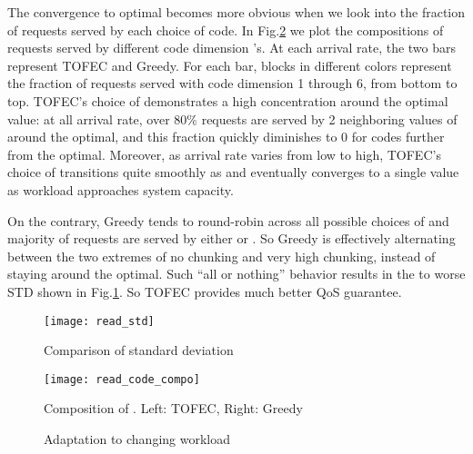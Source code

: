\documentclass[journal]{IEEEtran}
\newcommand{\ourproposal}{TOFEC\xspace}
\newcommand{\onewidth}{0.74\columnwidth}
\newcommand{\threewidth}{0.3\textwidth}
\begin{document}
The convergence to optimal becomes more obvious when we look into the fraction of requests served by each choice of code. In Fig.\ref{fig:read:composition} we plot the compositions of requests served by different code dimension 's. 
At each arrival rate, the two bars represent \ourproposal and Greedy. For each bar, blocks in different colors represent the fraction of requests served with code dimension
1 through 6, from bottom to top. \ourproposal's choice of  demonstrates a high concentration around the optimal value: at all arrival rate, over 80\%  requests are served by 2 neighboring values of  around the optimal, and this fraction quickly diminishes to 0 for codes further from the optimal. Moreover, as arrival rate varies from low to high, \ourproposal's choice of  transitions quite smoothly as  and eventually converges to a single value  as workload approaches system capacity.

On the contrary, Greedy tends to round-robin across all possible choices of  and majority of requests are served by either  or . So Greedy is effectively alternating between the two extremes of no chunking and very high chunking,  instead of staying around the optimal. 
Such ``all or nothing'' behavior results in the  to  worse STD shown in Fig.\ref{fig:read:std}. So \ourproposal provides much better QoS guarantee.









\begin{figure}[t]
\centering
\texttt{[image: read\_std]}
\caption{Comparison of standard deviation}
\label{fig:read:std}
\end{figure}

\begin{figure}[t]
\centering
\texttt{[image: read\_code\_compo]}
\caption{Composition of . Left: \ourproposal, Right: Greedy}
\label{fig:read:composition}
\end{figure}



\begin{figure*}[!t]
\centering
\hfill
\hfill
\caption{Adaptation to changing workload}
\label{fig:adapt}
\end{figure*}
\end{document}
